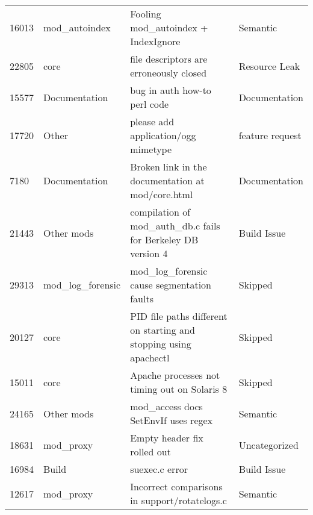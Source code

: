 \begin{longtable}[c]{p{1cm}p{3cm}p{6cm}p{4cm}}
16013  & mod\_autoindex     & Fooling mod\_autoindex + IndexIgnore                                                                           & Semantic          \\
22805  & core               & file descriptors are erroneously closed                                                                        & Resource Leak     \\
15577  & Documentation      & bug in auth how-to perl code                                                                                   & Documentation     \\
17720  & Other              & please add application/ogg mimetype                                                                            & feature request   \\
7180   & Documentation      & Broken link in the documentation at mod/core.html                                                              & Documentation     \\
21443  & Other mods         & compilation of mod\_auth\_db.c fails for Berkeley DB version 4                                                 & Build Issue       \\
29313  & mod\_log\_forensic & mod\_log\_forensic cause segmentation faults                                                                   & Skipped           \\
20127  & core               & PID file paths different on starting and stopping using apachectl                                              & Skipped           \\
15011  & core               & Apache processes not timing out on Solaris 8                                                                   & Skipped           \\
24165  & Other mods         & mod\_access docs SetEnvIf uses regex                                                                           & Semantic          \\
18631  & mod\_proxy         & Empty header fix rolled out                                                                                    & Uncategorized     \\
16984  & Build              & suexec.c error                                                                                                 & Build Issue       \\
12617  & mod\_proxy         & Incorrect comparisons in support/rotatelogs.c                                                                  & Semantic          \\

\end{longtable}

